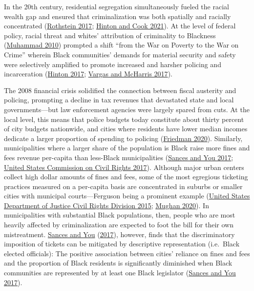 \documentclass[
  12pt,
]{article}
\begin{document}
In the 20th century, residential segregation simultaneously fueled the racial wealth gap and ensured that criminalization was both spatially and racially concentrated (\protect\hyperlink{ref-Rothstein2017}{Rothstein 2017}; \protect\hyperlink{ref-Hinton2021}{Hinton and Cook 2021}). At the level of federal policy, racial threat and whites' attribution of criminality to Blackness (\protect\hyperlink{ref-Muhammad2010}{Muhammad 2010}) prompted a shift ``from the War on Poverty to the War on Crime'' wherein Black communities' demands for material security and safety were selectively amplified to promote increased and harsher policing and incarceration (\protect\hyperlink{ref-Hinton2017}{Hinton 2017}; \protect\hyperlink{ref-Vargas2017a}{Vargas and McHarris 2017}).

The 2008 financial crisis solidified the connection between fiscal austerity and policing, prompting a decline in tax revenues that devastated state and local governments---but law enforcement agencies were largely spared from cuts. At the local level, this means that police budgets today constitute about thirty percent of city budgets nationwide, and cities where residents have lower median incomes dedicate a larger proportion of spending to policing (\protect\hyperlink{ref-Friedman2020}{Friedman 2020}). Similarly, municipalities where a larger share of the population is Black raise more fines and fees revenue per-capita than less-Black municipalities (\protect\hyperlink{ref-Sances2017}{Sances and You 2017}; \protect\hyperlink{ref-UnitedStatesCommissiononCivilRights2017}{United States Commission on Civil Rights 2017}). Although major urban centers collect high dollar amounts of fines and fees, some of the most egregious ticketing practices measured on a per-capita basis are concentrated in suburbs or smaller cities with municipal courts---Ferguson being a prominent example (\protect\hyperlink{ref-UnitedStatesDepartmentofJusticeCivilRightsDivision2015}{United States Department of Justice Civil Rights Division 2015}; \protect\hyperlink{ref-Mughan2020}{Mughan 2020}). In municipalities with substantial Black populations, then, people who are most heavily affected by criminalization are expected to foot the bill for their own mistreatment. \protect\hyperlink{ref-Sances2017}{Sances and You} (\protect\hyperlink{ref-Sances2017}{2017}), however, finds that the discriminatory imposition of tickets can be mitigated by descriptive representation (i.e.~Black elected officials): The positive association between cities' reliance on fines and fees and the proportion of Black residents is significantly diminished when Black communities are represented by at least one Black legislator (\protect\hyperlink{ref-Sances2017}{Sances and You 2017}).
\end{document}
